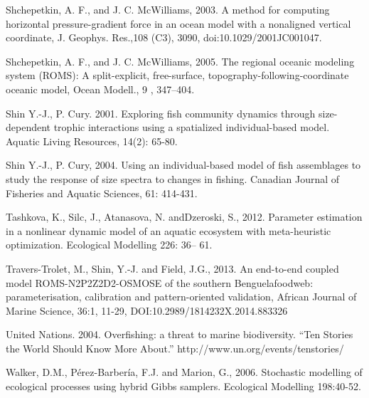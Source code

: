 Shchepetkin, A. F., and J. C. McWilliams, 2003. A method for computing horizontal pressure-gradient force in an ocean model with a nonaligned vertical coordinate, J. Geophys. Res.,108 (C3), 3090, doi:10.1029/2001JC001047.

Shchepetkin, A. F., and J. C. McWilliams, 2005. The regional oceanic modeling system (ROMS): A split-explicit, free-surface, topography-following-coordinate oceanic model, Ocean Modell., 9 , 347–404.

Shin Y.-J., P. Cury. 2001. Exploring fish community dynamics through size-dependent trophic interactions using a spatialized individual-based model. Aquatic Living Resources, 14(2): 65-80.

Shin Y.-J., P. Cury, 2004. Using an individual-based model of fish assemblages to study the response of size spectra to changes in fishing. Canadian Journal of Fisheries and Aquatic Sciences, 61: 414-431.

Tashkova, K., Silc, J., Atanasova, N. andDzeroski, S., 2012. Parameter estimation in a nonlinear dynamic model of an aquatic ecosystem with meta-heuristic optimization. Ecological Modelling 226: 36– 61.

Travers-Trolet, M., Shin, Y.-J. and Field, J.G., 2013. An end-to-end coupled model ROMS-N2P2Z2D2-OSMOSE of the southern Benguelafoodweb: parameterisation, calibration and pattern-oriented validation, African Journal of Marine Science, 36:1, 11-29,  DOI:10.2989/1814232X.2014.883326

United Nations. 2004. Overfishing: a threat to marine biodiversity. “Ten Stories the World Should Know More About.” http://www.un.org/events/tenstories/

Walker, D.M., Pérez-Barbería, F.J. and Marion, G., 2006. Stochastic modelling of ecological processes using hybrid Gibbs samplers. Ecological Modelling 198:40-52.



